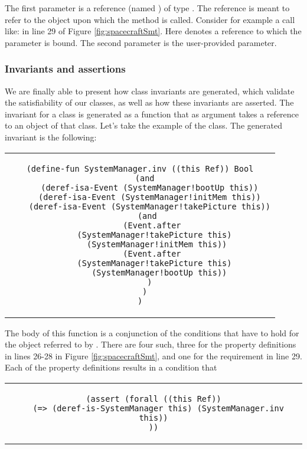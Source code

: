 The first parameter is a reference (named )
of type . The  reference is meant to 
refer to the object upon which the method is called. Consider for example a call like:  in line 29 of Figure
\ref{fig:spacecraftSmt}. Here  denotes a reference to which the parameter  is bound.
The second parameter is the user-provided parameter.

\subsubsection{Invariants and assertions}

We are finally able to present how class invariants are generated, 
which validate the satisfiability of our classes, as well as how 
these invariants are asserted. The invariant for a class is
generated as a function that as argument takes a 
reference to an object of that class. Let's take the example of the
 class. The generated invariant is the 
following:

\begin{center}
\begin{tabular}{c}
\begin{lstlisting}
(define-fun SystemManager.inv ((this Ref)) Bool
  (and
    (deref-isa-Event (SystemManager!bootUp this))
    (deref-isa-Event (SystemManager!initMem this))
    (deref-isa-Event (SystemManager!takePicture this))
    (and 
      (Event.after 
        (SystemManager!takePicture this)  
        (SystemManager!initMem this)) 
      (Event.after 
        (SystemManager!takePicture this)  
        (SystemManager!bootUp this))
    )
  )
)
\end{lstlisting}
\end{tabular}
\end{center}

The body of this function is a conjunction of the conditions
that have to hold for the  object referred to
by . There are four such, three for the property
definitions in lines 26-28 in Figure \ref{fig:spacecraftSmt},
and one for the requirement in line 29. Each of the property definitions results in a condition that 

\hline

\begin{center}
\begin{tabular}{c}
\begin{lstlisting}
(assert (forall ((this Ref))
  (=> (deref-is-SystemManager this) (SystemManager.inv this))
))
\end{lstlisting}
\end{tabular}
\end{center}

